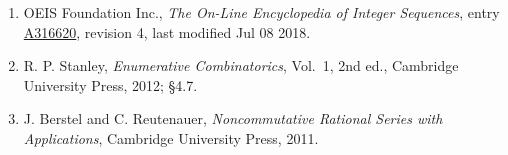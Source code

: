 \documentclass[11pt]{article}
\theoremstyle{definition}
\begin{document}
\begin{enumerate}

\item OEIS Foundation Inc., \emph{The On-Line Encyclopedia of Integer Sequences}, entry \href{https://oeis.org/A316620}{A316620}, revision 4, last modified Jul 08 2018.

\item R. P. Stanley, \emph{Enumerative Combinatorics}, Vol.~1, 2nd ed., Cambridge University Press, 2012; \S4.7.

\item J. Berstel and C. Reutenauer, \emph{Noncommutative Rational Series with Applications}, Cambridge University Press, 2011.

\end{enumerate}
\end{document}
